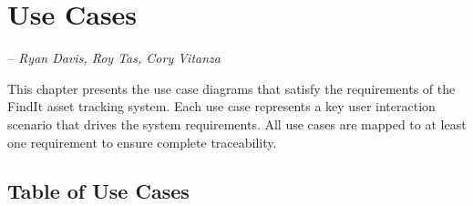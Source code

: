 \chapter{Use Cases}
\label{Chapter::UseCases}
\small{\textit{-- Ryan Davis, Roy Tas, Cory Vitanza}}

This chapter presents the use case diagrams that satisfy the requirements of the FindIt asset tracking system.
Each use case represents a key user interaction scenario that drives the system requirements. 
All use cases are mapped to at least one requirement to ensure complete traceability.  

\section{Table of Use Cases}

